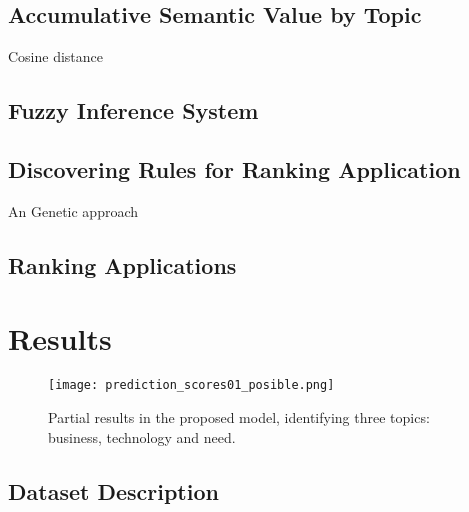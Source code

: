\subsection{Accumulative Semantic Value by Topic}
Cosine distance

\subsection{Fuzzy Inference System}

\subsection{Discovering Rules for Ranking Application}
An Genetic approach

\subsection{Ranking Applications}

%
\section{Results}
%
\begin{figure}[h]
	\label{fig:partialResults1}
	\texttt{[image: prediction\_scores01\_posible.png]}
    \caption{Partial results in the proposed model, identifying three topics: business, technology and need.}
\end{figure}

%
\subsection{Dataset Description}

